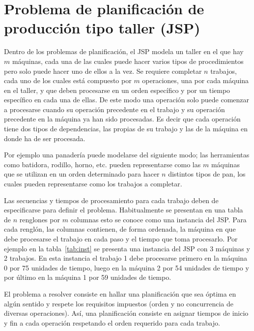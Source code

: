 \section{Problema de planificación de producción tipo taller (JSP)}

Dentro de los problemas de planificación, el JSP modela un taller en el que hay $m$ máquinas, cada una de las cuales puede hacer varios tipos 
de procedimientos pero solo puede hacer uno de ellos a la vez. 
%
Se requiere completar $n$ trabajos, cada uno de los cuales está compuesto por $m$ operaciones, una por cada máquina en el taller, y que deben 
procesarse en un orden específico y por un tiempo específico en cada una de ellas. De este modo una operación solo puede comenzar a procesarse cuando su operación precedente en el trabajo y su operación precedente en la máquina ya han sido procesadas. Es decir que cada operación tiene dos tipos de dependencias, las propias de su trabajo y las de la máquina en donde ha de ser procesada.

Por ejemplo una panadería puede modelarse del siguiente modo; las herramientas como batidora, rodillo, horno, etc. pueden representarse como las
$m$ máquinas que se utilizan en un orden determinado para hacer $n$ distintos tipos de pan, los cuales pueden representarse como los trabajos 
a completar.

Las secuencias y tiempos de procesamiento para cada trabajo deben de especificarse para definir el problema. 
%
Habitualmente se presentan en una tabla de $n$ renglones por $m$ columnas esto se conoce como una instancia del JSP. 
%
Para cada renglón, las columnas contienen, de forma ordenada, la máquina en que debe procesarse el trabajo en cada paso y el tiempo 
que toma procesarlo. 
%
Por ejemplo en la tabla~\ref{tab:inst} se presenta una instancia del JSP con 3 máquinas y 2 trabajos. 
%
En esta instancia el trabajo 1 debe procesarse primero en la máquina 0 por 75 unidades de tiempo, luego en la máquina 2 por 54 unidades de tiempo y 
por último en la máquina 1 por 59 unidades de tiempo.

El problema a resolver consiste en hallar una planificación que sea óptima en algún sentido y respete los requisitos impuestos (orden y no concurrencia de diversas
operaciones).
%
Así, una planificación consiste en asignar tiempos de inicio y fin a cada operación respetando el orden requerido para cada trabajo. 

